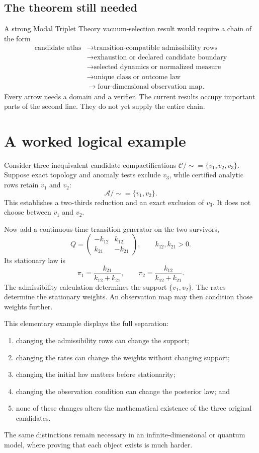 \documentclass[11pt]{article}
\theoremstyle{definition}
\theoremstyle{remark}
\newcommand{\cA}{\mathcal A}
\newcommand{\cC}{\mathcal C}
\newcommand{\1}{\mathbf 1}
\newcommand{\MTT}{Modal Triplet Theory}
\begin{document}
\subsection{The theorem still needed}

A strong \MTT{} vacuum-selection result would require a chain of the form
\[
\begin{aligned}
\text{candidate atlas}
&\longrightarrow
\text{transition-compatible admissibility rows}\\
&\longrightarrow
\text{exhaustion or declared candidate boundary}\\
&\longrightarrow
\text{selected dynamics or normalized measure}\\
&\longrightarrow
\text{unique class or outcome law}\\
&\longrightarrow
\text{four-dimensional observation map}.
\end{aligned}
\]
Every arrow needs a domain and a verifier.  The current results occupy
important parts of the second line.  They do not yet supply the entire
chain.

\section{A worked logical example}
\label{sec:example}

Consider three inequivalent candidate compactifications
\(\cC/\!\sim=\{v_1,v_2,v_3\}\).  Suppose exact topology and anomaly tests
exclude \(v_3\), while certified analytic rows retain \(v_1\) and \(v_2\):
\[
  \cA/\!\sim=\{v_1,v_2\}.
\]
This establishes a two-thirds reduction and an exact exclusion of
\(v_3\).  It does not choose between \(v_1\) and \(v_2\).

Now add a continuous-time transition generator on the two survivors,
\[
  Q=
  \begin{pmatrix}
    -k_{12} & k_{12}\\
    k_{21} & -k_{21}
  \end{pmatrix},
  \qquad k_{12},k_{21}>0.
\]
Its stationary law is
\[
  \pi_1=\frac{k_{21}}{k_{12}+k_{21}},
  \qquad
  \pi_2=\frac{k_{12}}{k_{12}+k_{21}}.
\]
The admissibility calculation determines the support
\(\{v_1,v_2\}\).  The rates determine the stationary weights.  An
observation map may then condition those weights further.

This elementary example displays the full separation:
\begin{enumerate}[leftmargin=2em]
\item changing the admissibility rows can change the support;
\item changing the rates can change the weights without changing support;
\item changing the initial law matters before stationarity;
\item changing the observation condition can change the posterior law; and
\item none of these changes alters the mathematical existence of the three
      original candidates.
\end{enumerate}
The same distinctions remain necessary in an infinite-dimensional or
quantum model, where proving that each object exists is much harder.
\end{document}

